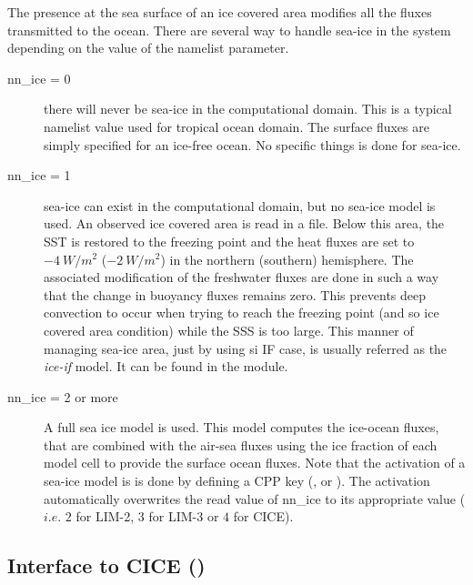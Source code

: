 The presence at the sea surface of an ice covered area modifies all the fluxes 
transmitted to the ocean. There are several way to handle sea-ice in the system 
depending on the value of the  namelist parameter.  
\begin{description}
\item[nn{\_}ice = 0]  there will never be sea-ice in the computational domain. 
This is a typical namelist value used for tropical ocean domain. The surface fluxes 
are simply specified for an ice-free ocean. No specific things is done for sea-ice.
\item[nn{\_}ice = 1]  sea-ice can exist in the computational domain, but no sea-ice model 
is used. An observed ice covered area is read in a file. Below this area, the SST is 
restored to the freezing point and the heat fluxes are set to $-4~W/m^2$ ($-2~W/m^2$) 
in the northern (southern) hemisphere. The associated modification of the freshwater 
fluxes are done in such a way that the change in buoyancy fluxes remains zero. 
This prevents deep convection to occur when trying to reach the freezing point 
(and so ice covered area condition) while the SSS is too large. This manner of 
managing sea-ice area, just by using si IF case, is usually referred as the \textit{ice-if} 
model. It can be found in the  module.
\item[nn{\_}ice = 2 or more]  A full sea ice model is used. This model computes the 
ice-ocean fluxes, that are combined with the air-sea fluxes using the ice fraction of 
each model cell to provide the surface ocean fluxes. Note that the activation of a 
sea-ice model is is done by defining a CPP key (,  or ). 
The activation automatically overwrites the read value of nn{\_}ice to its appropriate 
value ($i.e.$ $2$ for LIM-2, $3$ for LIM-3 or $4$ for CICE).
\end{description}


\subsection   [Interface to CICE (\textit{sbcice\_cice})]
			{Interface to CICE ()}
\label{SBC_cice}

